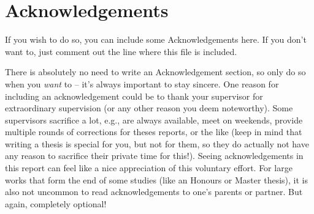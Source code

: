 \chapter*{Acknowledgements}

If you wish to do so, you can include some Acknowledgements here. If you don't want to, just comment out the line where this file is included.

There is absolutely no need to write an Acknowledgement section, so only do so when you \emph{want} to -- it's always important to stay sincere. One reason for including an acknowledgement could be to thank your supervisor for extraordinary supervision (or any other reason you deem noteworthy). Some supervisors sacrifice a lot, e.g., are always available, meet on weekends, provide multiple rounds of corrections for theses reports, or the like (keep in mind that writing a thesis is special for you, but not for them, so they do actually not have any reason to sacrifice their private time for this!). Seeing acknowledgements in this report can feel like a nice appreciation of this voluntary effort. For large works that form the end of some studies (like an Honours or Master thesis), it is also not uncommon to read acknowledgements to one's parents or partner. But again, completely optional!